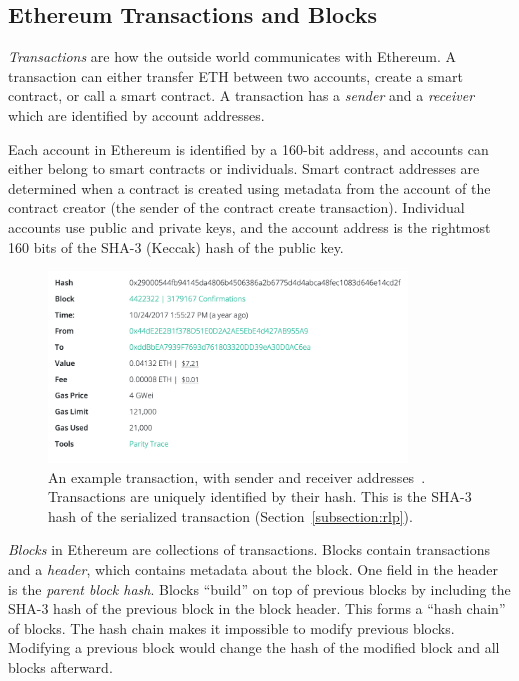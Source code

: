 \documentclass[12pt]{article}
\newcommand{\figurewidth}{0.85\textwidth}
\begin{document}
\subsection{Ethereum Transactions and Blocks}

\emph{Transactions} are how the outside world communicates with Ethereum. A transaction can either transfer ETH between two accounts, create a smart contract, or call a smart contract. A transaction has a \emph{sender} and a \emph{receiver} which are identified by account addresses.

Each account in Ethereum is identified by a 160-bit address, and accounts can either belong to smart contracts or individuals. Smart contract addresses are determined when a contract is created using metadata from the account of the contract creator (the sender of the contract create transaction). Individual accounts use public and private keys, and the account address is the rightmost 160 bits of the SHA-3 (Keccak) hash of the public key. %

\begin{figure}[H]
  \centering
  \includegraphics[width=\figurewidth]{../figures/background/transactions/example_transaction.png}
  \caption{An example transaction, with sender and receiver addresses~\cite{etherchain-transaction}. Transactions are uniquely identified by their hash. This is the SHA-3 hash of the serialized transaction (Section~\ref{subsection:rlp}).}
\end{figure}

\emph{Blocks} in Ethereum are collections of transactions. Blocks contain transactions and a \emph{header}, which contains metadata about the block. One field in the header is the \emph{parent block hash}. Blocks ``build'' on top of previous blocks by including the SHA-3 hash of the previous block in the block header. This forms a ``hash chain'' of blocks. The hash chain makes it impossible to modify previous blocks. Modifying a previous block would change the hash of the modified block and all blocks afterward.
\end{document}

